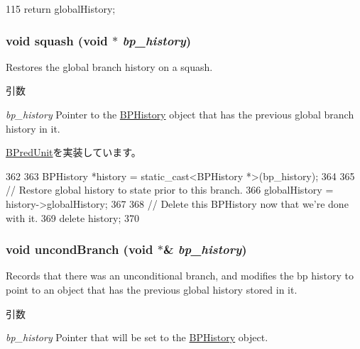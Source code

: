 \begin{DoxyCode}
115 { return globalHistory; }
\end{DoxyCode}
\hypertarget{classTournamentBP_aeb215cee5cdccdf52d02b73fffe80220}{
\subsubsection[{squash}]{\setlength{\rightskip}{0pt plus 5cm}void squash (void $\ast$ {\em bp\_\-history})}}
\label{classTournamentBP_aeb215cee5cdccdf52d02b73fffe80220}
Restores the global branch history on a squash. 
\begin{DoxyParams}{引数}
\item[{\em bp\_\-history}]Pointer to the \hyperlink{structTournamentBP_1_1BPHistory}{BPHistory} object that has the previous global branch history in it. \end{DoxyParams}


\hyperlink{classBPredUnit_a2af63ba741727bdf58e2b2dc22a912ed}{BPredUnit}を実装しています。


\begin{DoxyCode}
362 {
363     BPHistory *history = static_cast<BPHistory *>(bp_history);
364 
365     // Restore global history to state prior to this branch.
366     globalHistory = history->globalHistory;
367 
368     // Delete this BPHistory now that we're done with it.
369     delete history;
370 }
\end{DoxyCode}
\hypertarget{classTournamentBP_ad3d898a5eab93d923a1073fe6a0f0030}{
\subsubsection[{uncondBranch}]{\setlength{\rightskip}{0pt plus 5cm}void uncondBranch (void $\ast$\& {\em bp\_\-history})}}
\label{classTournamentBP_ad3d898a5eab93d923a1073fe6a0f0030}
Records that there was an unconditional branch, and modifies the bp history to point to an object that has the previous global history stored in it. 
\begin{DoxyParams}{引数}
\item[{\em bp\_\-history}]Pointer that will be set to the \hyperlink{structTournamentBP_1_1BPHistory}{BPHistory} object. \end{DoxyParams}


